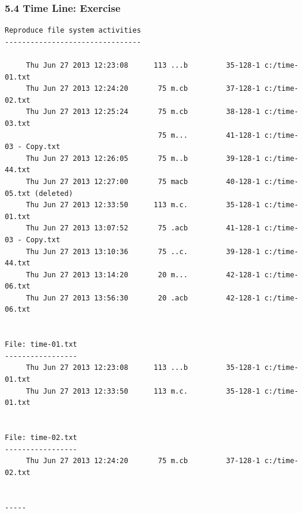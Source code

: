 \begin{frame}[fragile]
  \frametitle{5.4 Time Line: Exercise}
  \begin{lstlisting}[basicstyle=\tiny]
Reproduce file system activities
--------------------------------
  
     Thu Jun 27 2013 12:23:08      113 ...b         35-128-1 c:/time-01.txt
     Thu Jun 27 2013 12:24:20       75 m.cb         37-128-1 c:/time-02.txt
     Thu Jun 27 2013 12:25:24       75 m.cb         38-128-1 c:/time-03.txt
                                    75 m...         41-128-1 c:/time-03 - Copy.txt
     Thu Jun 27 2013 12:26:05       75 m..b         39-128-1 c:/time-44.txt
     Thu Jun 27 2013 12:27:00       75 macb         40-128-1 c:/time-05.txt (deleted)
     Thu Jun 27 2013 12:33:50      113 m.c.         35-128-1 c:/time-01.txt
     Thu Jun 27 2013 13:07:52       75 .acb         41-128-1 c:/time-03 - Copy.txt
     Thu Jun 27 2013 13:10:36       75 ..c.         39-128-1 c:/time-44.txt
     Thu Jun 27 2013 13:14:20       20 m...         42-128-1 c:/time-06.txt
     Thu Jun 27 2013 13:56:30       20 .acb         42-128-1 c:/time-06.txt


File: time-01.txt
-----------------
     Thu Jun 27 2013 12:23:08      113 ...b         35-128-1 c:/time-01.txt
     Thu Jun 27 2013 12:33:50      113 m.c.         35-128-1 c:/time-01.txt


File: time-02.txt
-----------------
     Thu Jun 27 2013 12:24:20       75 m.cb         37-128-1 c:/time-02.txt


-----
  \end{lstlisting}
\end{frame}


